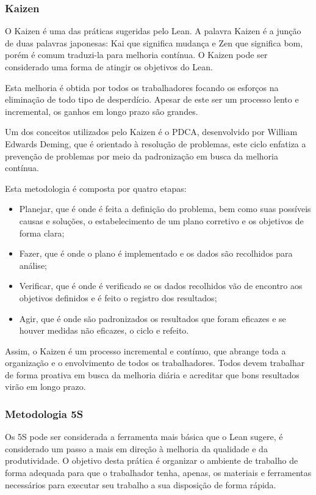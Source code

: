\subsubsection[Kaizen]{Kaizen}

O Kaizen é uma das práticas sugeridas pelo Lean. A palavra Kaizen é a junção de duas palavras japonesas: Kai que significa mudança e Zen que significa bom, porém é comum traduzi-la para melhoria contínua. O Kaizen  pode ser considerado uma forma de atingir os objetivos do Lean.

Esta melhoria é obtida por todos os trabalhadores focando os esforços na eliminação de todo tipo de desperdício. Apesar de este ser um processo lento e incremental, os ganhos em longo prazo são grandes.

Um dos conceitos utilizados pelo Kaizen é o PDCA, desenvolvido por William Edwards Deming, que é orientado à resolução de problemas, este ciclo enfatiza a prevenção de problemas por meio da padronização em busca da melhoria contínua. 

Esta metodologia é composta por quatro etapas:
\begin{itemize}
\item Planejar, que é onde é feita a definição do problema, bem como suas possíveis causas e soluções, o estabelecimento de um plano corretivo e os objetivos de forma clara;
\item Fazer, que é onde o plano é implementado e os dados são recolhidos para análise;
\item Verificar, que é onde é verificado se os dados recolhidos vão de encontro aos objetivos definidos e é feito o registro dos resultados;
\item Agir, que é onde são padronizados os resultados que foram eficazes e se houver medidas não eficazes, o ciclo e refeito.
\end{itemize}

Assim, o Kaizen é um processo incremental e contínuo, que abrange toda a organização e o envolvimento de todos os trabalhadores. Todos devem trabalhar de forma proativa em busca da melhoria diária e acreditar que bons resultados virão em longo prazo.

\subsubsection[Metodologia 5S]{Metodologia 5S}

Os 5S pode ser considerada a ferramenta mais básica que o Lean sugere, é considerado um passo a mais em direção à melhoria da qualidade e da produtividade. O objetivo desta prática é organizar o ambiente de trabalho de forma adequada para que o trabalhador tenha, apenas, os materiais e ferramentas necessários para executar seu trabalho a sua disposição de forma rápida. 

